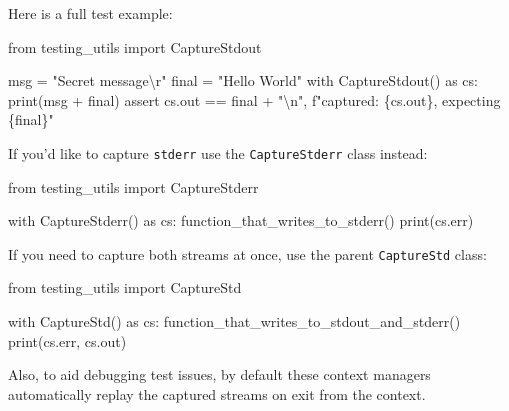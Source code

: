 \documentclass[
]{report}
\newenvironment{Shaded}{\begin{snugshade}}{\end{snugshade}}
\newcommand{\BuiltInTok}[1]{\textcolor[rgb]{0.00,0.23,0.31}{#1}}
\newcommand{\CharTok}[1]{\textcolor[rgb]{0.13,0.47,0.30}{#1}}
\newcommand{\ControlFlowTok}[1]{\textcolor[rgb]{0.00,0.23,0.31}{#1}}
\newcommand{\ImportTok}[1]{\textcolor[rgb]{0.00,0.46,0.62}{#1}}
\newcommand{\NormalTok}[1]{\textcolor[rgb]{0.00,0.23,0.31}{#1}}
\newcommand{\OperatorTok}[1]{\textcolor[rgb]{0.37,0.37,0.37}{#1}}
\newcommand{\SpecialCharTok}[1]{\textcolor[rgb]{0.37,0.37,0.37}{#1}}
\newcommand{\SpecialStringTok}[1]{\textcolor[rgb]{0.13,0.47,0.30}{#1}}
\newcommand{\StringTok}[1]{\textcolor[rgb]{0.13,0.47,0.30}{#1}}
\begin{document}
Here is a full test example:

\begin{Shaded}
\begin{Highlighting}[]
\ImportTok{from}\NormalTok{ testing\_utils }\ImportTok{import}\NormalTok{ CaptureStdout}

\NormalTok{msg }\OperatorTok{=} \StringTok{"Secret message}\CharTok{\textbackslash{}r}\StringTok{"}
\NormalTok{final }\OperatorTok{=} \StringTok{"Hello World"}
\ControlFlowTok{with}\NormalTok{ CaptureStdout() }\ImportTok{as}\NormalTok{ cs:}
    \BuiltInTok{print}\NormalTok{(msg }\OperatorTok{+}\NormalTok{ final)}
\ControlFlowTok{assert}\NormalTok{ cs.out }\OperatorTok{==}\NormalTok{ final }\OperatorTok{+} \StringTok{"}\CharTok{\textbackslash{}n}\StringTok{"}\NormalTok{, }\SpecialStringTok{f"captured: }\SpecialCharTok{\{}\NormalTok{cs}\SpecialCharTok{.}\NormalTok{out}\SpecialCharTok{\}}\SpecialStringTok{, expecting }\SpecialCharTok{\{}\NormalTok{final}\SpecialCharTok{\}}\SpecialStringTok{"}
\end{Highlighting}
\end{Shaded}

If you'd like to capture \texttt{stderr} use the \texttt{CaptureStderr}
class instead:

\begin{Shaded}
\begin{Highlighting}[]
\ImportTok{from}\NormalTok{ testing\_utils }\ImportTok{import}\NormalTok{ CaptureStderr}

\ControlFlowTok{with}\NormalTok{ CaptureStderr() }\ImportTok{as}\NormalTok{ cs:}
\NormalTok{    function\_that\_writes\_to\_stderr()}
\BuiltInTok{print}\NormalTok{(cs.err)}
\end{Highlighting}
\end{Shaded}

If you need to capture both streams at once, use the parent
\texttt{CaptureStd} class:

\begin{Shaded}
\begin{Highlighting}[]
\ImportTok{from}\NormalTok{ testing\_utils }\ImportTok{import}\NormalTok{ CaptureStd}

\ControlFlowTok{with}\NormalTok{ CaptureStd() }\ImportTok{as}\NormalTok{ cs:}
\NormalTok{    function\_that\_writes\_to\_stdout\_and\_stderr()}
\BuiltInTok{print}\NormalTok{(cs.err, cs.out)}
\end{Highlighting}
\end{Shaded}

Also, to aid debugging test issues, by default these context managers
automatically replay the captured streams on exit from the context.
\end{document}
